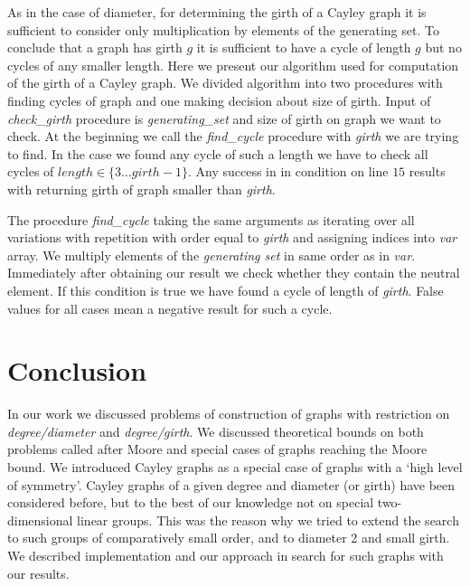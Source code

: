 \documentclass[a4paper,12pt,oneside]{report}%
\begin{document}
As in the case of diameter, for determining the girth of a Cayley graph it is sufficient to consider only multiplication by elements of the generating set.
To conclude that a graph has girth $g$ it is sufficient to have a cycle of length $g$ but no cycles of any smaller length.
Here we present our algorithm used for computation of the girth of a Cayley graph. We divided algorithm into two procedures with finding cycles of graph and one making decision about size of girth.
Input of {\em check\_girth} procedure is {\em generating\_set} and size of girth on graph we want to check.
At the beginning we call the {\em find\_cycle} procedure with {\em girth} we are trying to find. In the case we found any cycle of such a length we have to check all cycles of $length \in \{3 \dots girth - 1\}$. Any success in in condition on line $15$ results with returning girth of graph smaller than {\em girth}. 

The procedure {\em find\_cycle} taking the same arguments as  iterating over all variations with repetition with order equal to {\em girth} and assigning indices into {\em var} array. We multiply elements of the {\em generating set} in same order as in {\em var}. Immediately after obtaining our result we check whether they contain the neutral element. If this condition is true we have found a cycle of length of {\em girth}. False values for  all cases mean a negative result for such a cycle.



\newpage

\section{Conclusion}

In our work we discussed problems of construction of graphs with restriction on {\em degree/diameter} and {\em degree/girth}. We discussed theoretical bounds on both problems called after Moore and special cases of graphs reaching the Moore bound. We introduced Cayley graphs as a special case of graphs with a `high level of symmetry'. Cayley graphs of a given degree and diameter (or girth) have been considered before, but to the best of our knowledge not on special two-dimensional linear groups. This was the reason why we tried to extend the search to such groups of comparatively small order, and to diameter 2 and small girth. We described implementation and our approach in search for such graphs with our results.
\end{document}

